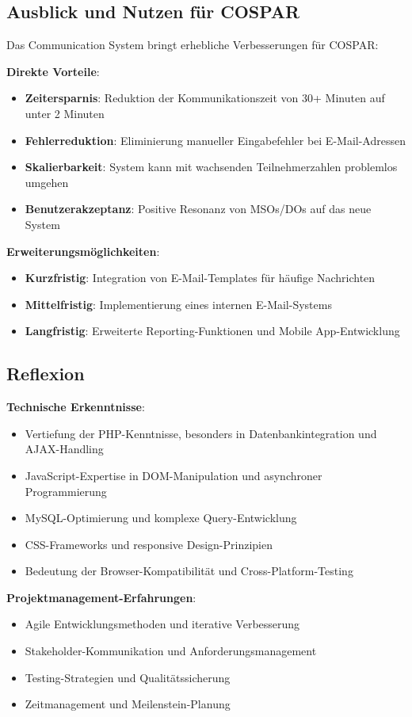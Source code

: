 \documentclass[11pt,a4paper]{article}
\begin{document}
\subsection{Ausblick und Nutzen für COSPAR}
Das Communication System bringt erhebliche Verbesserungen für COSPAR:

\textbf{Direkte Vorteile}:
\begin{itemize}
    \item \textbf{Zeitersparnis}: Reduktion der Kommunikationszeit von 30+ Minuten auf unter 2 Minuten
    \item \textbf{Fehlerreduktion}: Eliminierung manueller Eingabefehler bei E-Mail-Adressen
    \item \textbf{Skalierbarkeit}: System kann mit wachsenden Teilnehmerzahlen problemlos umgehen
    \item \textbf{Benutzerakzeptanz}: Positive Resonanz von MSOs/DOs auf das neue System
\end{itemize}

\textbf{Erweiterungsmöglichkeiten}:
\begin{itemize}
    \item \textbf{Kurzfristig}: Integration von E-Mail-Templates für häufige Nachrichten
    \item \textbf{Mittelfristig}: Implementierung eines internen E-Mail-Systems
    \item \textbf{Langfristig}: Erweiterte Reporting-Funktionen und Mobile App-Entwicklung
\end{itemize}

\subsection{Reflexion}
\textbf{Technische Erkenntnisse}:
\begin{itemize}
    \item Vertiefung der PHP-Kenntnisse, besonders in Datenbankintegration und AJAX-Handling
    \item JavaScript-Expertise in DOM-Manipulation und asynchroner Programmierung
    \item MySQL-Optimierung und komplexe Query-Entwicklung
    \item CSS-Frameworks und responsive Design-Prinzipien
    \item Bedeutung der Browser-Kompatibilität und Cross-Platform-Testing
\end{itemize}

\textbf{Projektmanagement-Erfahrungen}:
\begin{itemize}
    \item Agile Entwicklungsmethoden und iterative Verbesserung
    \item Stakeholder-Kommunikation und Anforderungsmanagement
    \item Testing-Strategien und Qualitätssicherung
    \item Zeitmanagement und Meilenstein-Planung
\end{itemize}
\end{document}
